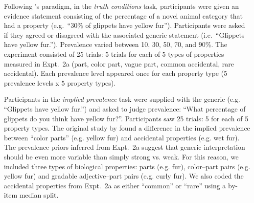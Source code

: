 \documentclass[10pt,letterpaper]{article}
\begin{document}
Following \citeauthor{Cimpian2010}'s paradigm, in the \emph{truth conditions} task, participants were given an evidence statement consisting of the percentage of a novel animal category that had a property (e.g.~``30\% of glippets have yellow fur''). 
Participants were asked if they agreed or disagreed with the associated generic statement (i.e.~``Glippets have yellow fur.'').
Prevalence varied between 10, 30, 50, 70, and 90\%.
The experiment consisted of 25 trials: 5 trials for each of 5 types of properties measured in Expt.~2a (part, color part, vague part, common accidental, rare accidental). 
Each prevalence level appeared once for each property type (5 prevalence levels x 5 property types). 

Participants in the \emph{implied prevalence} task were supplied with the generic (e.g. ``Glippets have yellow fur.'') and asked to judge prevalence: ``What percentage of glippets do you think have yellow fur?''. Participants saw 25 trials: 5 for each of 5 property types.
The original study by \citeauthor{Cimpian2010} found a difference in the implied prevalence between ``color parts'' (e.g. yellow fur) and accidental properties (e.g. wet fur).
The prevalence priors inferred from Expt.~2a suggest that generic interpretation should be even more variable than simply strong vs. weak.
For this reason, we included three types of biological properties: parts (e.g. fur), color--part pairs (e.g. yellow fur) and gradable adjective--part pairs (e.g. curly fur). 
We also coded the accidental properties from Expt.~2a as either ``common'' or ``rare'' using a by-item median split.



\end{document}
